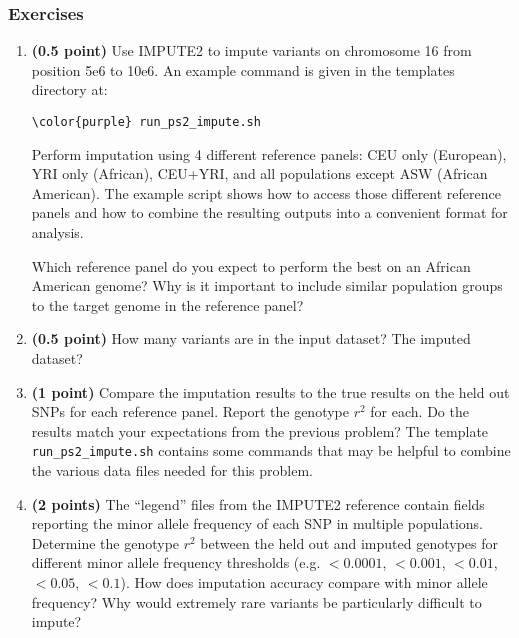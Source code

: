 \documentclass[12pt]{article}
\begin{document}
\subsubsection*{Exercises}
\begin{enumerate}

\item \textbf{(0.5 point)} Use IMPUTE2 to impute variants on chromosome 16 from position 5e6 to 10e6. An example command is given in the templates directory at:
\begin{Verbatim}[commandchars=\\\{\}]
\color{purple} run_ps2_impute.sh
\end{Verbatim}
Perform imputation using 4 different reference panels: CEU only (European), YRI only (African), CEU+YRI, and all populations except ASW (African American). The example script shows how to access those different reference panels and how to combine the resulting outputs into a convenient format for analysis.

Which reference panel do you expect to perform the best on an African American genome? Why is it important to include similar population groups to the target genome in the reference panel?

\item \textbf{(0.5 point)} How many variants are in the input dataset? The imputed dataset?

\item \textbf{(1 point)} Compare the imputation results to the true results on the held out SNPs for each reference panel. Report the genotype $r^2$ for each. Do the results match your expectations from the previous problem? The template \texttt{run\_ps2\_impute.sh} contains some commands that may be helpful to combine the various data files needed for this problem.

\item \textbf{(2 points)} The ``legend'' files from the IMPUTE2 reference contain fields reporting the minor allele frequency of each SNP in multiple populations. Determine the genotype $r^2$ between the held out and imputed genotypes for different minor allele frequency thresholds (e.g. $<0.0001$, $<0.001$, $<0.01$, $<0.05$, $<0.1$). How does imputation accuracy compare with minor allele frequency? Why would extremely rare variants be particularly difficult to impute?

\end{enumerate}
\end{document}
